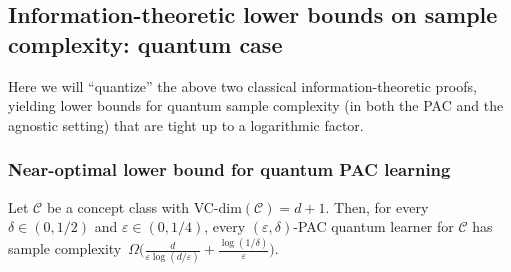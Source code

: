 \documentclass[twoside,11pt]{article}
\newcommand{\eps}{\varepsilon}
\newcommand{\C}{\ensuremath{\mathscr{C}}}
\begin{document}
\subsection{Information-theoretic lower bounds on sample complexity: quantum case}
\label{section:infotheoreticlowerboundsquantum}

Here we will ``quantize'' the above two classical information-theoretic proofs, yielding lower bounds for quantum sample complexity (in both the PAC and the agnostic setting) that are tight up to a logarithmic factor.

\subsubsection{Near-optimal lower bound for quantum PAC learning}

\begin{theorem}\label{thm:infoquantumpac}
	Let $\C$ be a concept class with VC-dim$(\C)=d+1$. Then, for every $\delta\in (0,1/2)$ and $\eps \in (0,1/4)$, every $(\eps,\delta)$-PAC quantum learner for $\C$ has sample complexity~$\Omega\Big(\frac{d}{\eps\log(d/\eps)} + \frac{\log(1/\delta)}{\eps}\Big)$.
\end{theorem}
\end{document}
